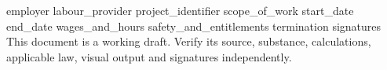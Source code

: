 \documentclass[11pt,a4paper]{article}
\begin{document}
{{employer}}
{{labour_provider}}
{{project_identifier}}
{{scope_of_work}}
{{start_date}}
{{end_date}}
{{wages_and_hours}}
{{safety_and_entitlements}}
{{termination}}
{{signatures}}
This document is a working draft. Verify its source, substance, calculations, applicable law, visual output and signatures independently.
\end{document}
